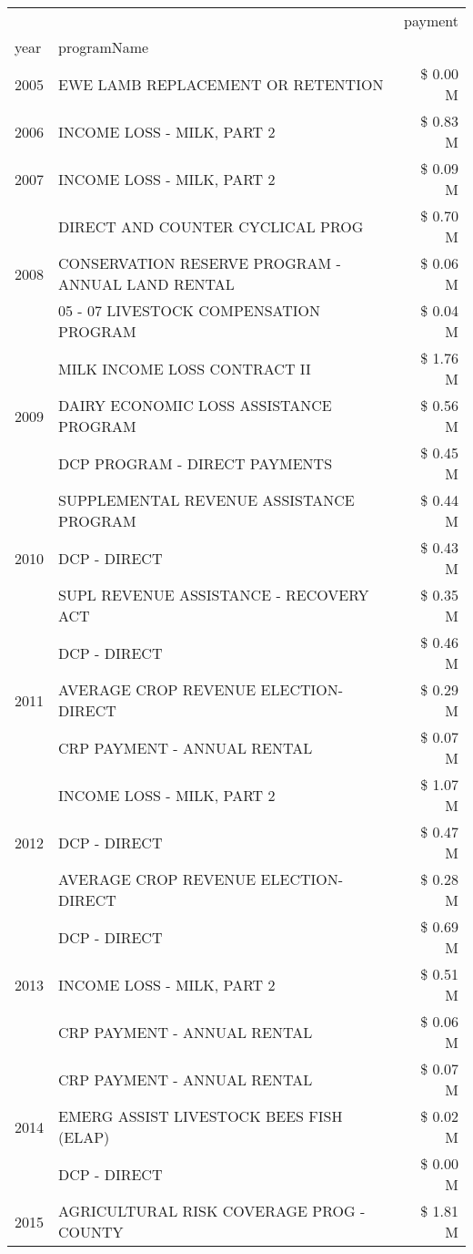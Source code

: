 \begin{tabular}{llr}
\toprule
 &  & payment \\
year & programName &  \\
\midrule
2005 & EWE LAMB REPLACEMENT OR RETENTION & \$ 0.00 M \\
\cline{1-3}
2006 & INCOME LOSS - MILK, PART 2 & \$ 0.83 M \\
\cline{1-3}
2007 & INCOME LOSS - MILK, PART 2 & \$ 0.09 M \\
\cline{1-3}
\multirow[t]{3}{*}{2008} & DIRECT AND COUNTER CYCLICAL PROG & \$ 0.70 M \\
 & CONSERVATION RESERVE PROGRAM - ANNUAL LAND RENTAL & \$ 0.06 M \\
 & 05 - 07 LIVESTOCK COMPENSATION PROGRAM & \$ 0.04 M \\
\cline{1-3}
\multirow[t]{3}{*}{2009} & MILK INCOME LOSS CONTRACT II & \$ 1.76 M \\
 & DAIRY ECONOMIC LOSS ASSISTANCE PROGRAM & \$ 0.56 M \\
 & DCP PROGRAM - DIRECT PAYMENTS & \$ 0.45 M \\
\cline{1-3}
\multirow[t]{3}{*}{2010} & SUPPLEMENTAL REVENUE ASSISTANCE PROGRAM & \$ 0.44 M \\
 & DCP - DIRECT & \$ 0.43 M \\
 & SUPL REVENUE ASSISTANCE - RECOVERY ACT & \$ 0.35 M \\
\cline{1-3}
\multirow[t]{3}{*}{2011} & DCP - DIRECT & \$ 0.46 M \\
 & AVERAGE CROP REVENUE ELECTION-DIRECT & \$ 0.29 M \\
 & CRP PAYMENT - ANNUAL RENTAL & \$ 0.07 M \\
\cline{1-3}
\multirow[t]{3}{*}{2012} & INCOME LOSS - MILK, PART 2 & \$ 1.07 M \\
 & DCP - DIRECT & \$ 0.47 M \\
 & AVERAGE CROP REVENUE ELECTION-DIRECT & \$ 0.28 M \\
\cline{1-3}
\multirow[t]{3}{*}{2013} & DCP - DIRECT & \$ 0.69 M \\
 & INCOME LOSS - MILK, PART 2 & \$ 0.51 M \\
 & CRP PAYMENT - ANNUAL RENTAL & \$ 0.06 M \\
\cline{1-3}
\multirow[t]{3}{*}{2014} & CRP PAYMENT - ANNUAL RENTAL & \$ 0.07 M \\
 & EMERG ASSIST LIVESTOCK BEES FISH (ELAP) & \$ 0.02 M \\
 & DCP - DIRECT & \$ 0.00 M \\
\cline{1-3}
\multirow[t]{3}{*}{2015} & AGRICULTURAL RISK COVERAGE PROG - COUNTY & \$ 1.81 M \\

\end{tabular}
